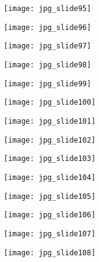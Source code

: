 \documentclass[main.tex]{subfiles}
\begin{document}
\begin{center}
\texttt{[image: jpg\_slide95]}
\end{center}

\begin{center}
\texttt{[image: jpg\_slide96]}
\end{center}

\begin{center}
\texttt{[image: jpg\_slide97]}
\end{center}

\begin{center}
\texttt{[image: jpg\_slide98]}
\end{center}

\begin{center}
\texttt{[image: jpg\_slide99]}
\end{center}

\begin{center}
\texttt{[image: jpg\_slide100]}
\end{center}

\begin{center}
\texttt{[image: jpg\_slide101]}
\end{center}

\begin{center}
\texttt{[image: jpg\_slide102]}
\end{center}

\begin{center}
\texttt{[image: jpg\_slide103]}
\end{center}

\begin{center}
\texttt{[image: jpg\_slide104]}
\end{center}

\begin{center}
\texttt{[image: jpg\_slide105]}
\end{center}

\begin{center}
\texttt{[image: jpg\_slide106]}
\end{center}

\begin{center}
\texttt{[image: jpg\_slide107]}
\end{center}

\begin{center}
\texttt{[image: jpg\_slide108]}
\end{center}
\end{document}
